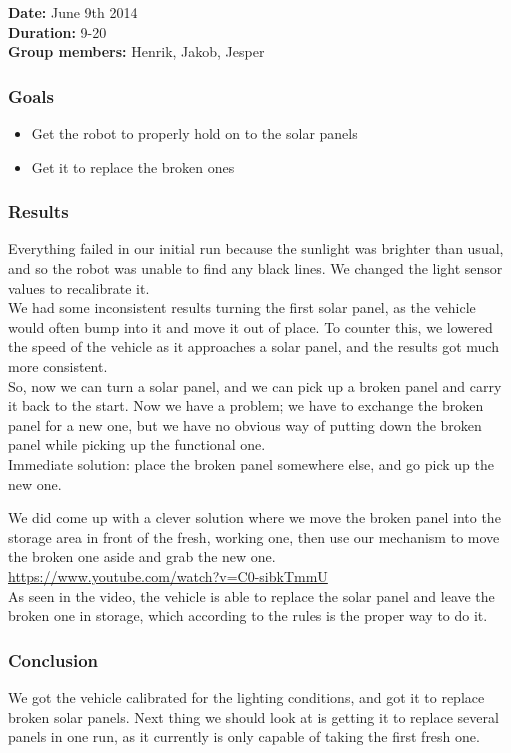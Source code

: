 \textbf{Date:} June 9th 2014\\\textbf{Duration:} 9-20\\\textbf{Group
members:} Henrik, Jakob, Jesper

\subsubsection{Goals}

\begin{itemize}
\itemsep1pt\parskip0pt
\item
  Get the robot to properly hold on to the solar panels
\item
  Get it to replace the broken ones
\end{itemize}

\subsubsection{Results}

Everything failed in our initial run because the sunlight was brighter
than usual, and so the robot was unable to find any black lines. We
changed the light sensor values to recalibrate it.\\We had some
inconsistent results turning the first solar panel, as the vehicle would
often bump into it and move it out of place. To counter this, we lowered
the speed of the vehicle as it approaches a solar panel, and the results
got much more consistent.\\So, now we can turn a solar panel, and we can
pick up a broken panel and carry it back to the start. Now we have a
problem; we have to exchange the broken panel for a new one, but we have
no obvious way of putting down the broken panel while picking up the
functional one.\\Immediate solution: place the broken panel somewhere
else, and go pick up the new one.

We did come up with a clever solution where we move the broken panel
into the storage area in front of the fresh, working one, then use our
mechanism to move the broken one aside and grab the new
one.\\\url{https://www.youtube.com/watch?v=C0-sibkTmmU}\\As seen in the
video, the vehicle is able to replace the solar panel and leave the
broken one in storage, which according to the rules is the proper way to
do it.

\subsubsection{Conclusion}

We got the vehicle calibrated for the lighting conditions, and got it to
replace broken solar panels. Next thing we should look at is getting it
to replace several panels in one run, as it currently is only capable of
taking the first fresh one.
